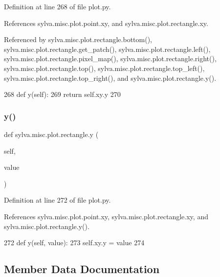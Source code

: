 Definition at line 268 of file plot.\+py.



References sylva.\+misc.\+plot.\+point.\+xy, and sylva.\+misc.\+plot.\+rectangle.\+xy.



Referenced by sylva.\+misc.\+plot.\+rectangle.\+bottom(), sylva.\+misc.\+plot.\+rectangle.\+get\+\_\+patch(), sylva.\+misc.\+plot.\+rectangle.\+left(), sylva.\+misc.\+plot.\+rectangle.\+pixel\+\_\+map(), sylva.\+misc.\+plot.\+rectangle.\+right(), sylva.\+misc.\+plot.\+rectangle.\+top(), sylva.\+misc.\+plot.\+rectangle.\+top\+\_\+left(), sylva.\+misc.\+plot.\+rectangle.\+top\+\_\+right(), and sylva.\+misc.\+plot.\+rectangle.\+y().


\begin{DoxyCode}
268         \textcolor{keyword}{def }y(self):
269             \textcolor{keywordflow}{return} self.xy.y
270 
\end{DoxyCode}
\mbox{\label{classsylva_1_1misc_1_1plot_1_1rectangle_a99edbd1ca0485e36233c604797adcda8}} 
\subsubsection{\texorpdfstring{y()}{y()}\hspace{0.1cm}{\footnotesize\ttfamily [2/2]}}
{\footnotesize\ttfamily def sylva.\+misc.\+plot.\+rectangle.\+y (\begin{DoxyParamCaption}\item[{}]{self,  }\item[{}]{value }\end{DoxyParamCaption})}



Definition at line 272 of file plot.\+py.



References sylva.\+misc.\+plot.\+point.\+xy, sylva.\+misc.\+plot.\+rectangle.\+xy, and sylva.\+misc.\+plot.\+rectangle.\+y().


\begin{DoxyCode}
272         \textcolor{keyword}{def }y(self, value):
273             self.xy.y = value
274 
\end{DoxyCode}


\subsection{Member Data Documentation}
\mbox{\label{classsylva_1_1misc_1_1plot_1_1rectangle_aa6bbc8337c03f65fc0097a8013f9c475}} 
